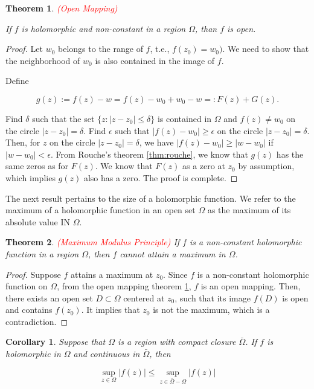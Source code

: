 \documentclass{article}
\newtheorem{theorem}{Theorem}
\newtheorem{corollary}{Corollary}
\begin{document}
\begin{theorem} \label{thm:open_map} \textcolor{red}{(Open Mapping)}

If $f$ is holomorphic and non-constant in a region $\Omega$, than $f$ is open.
\end{theorem}

\begin{proof}
Let $w_0$ belongs to the range of $f$, t.e., $f(z_0)=w_0)$. We need to show that the neighborhood of $w_0$ is also contained in the image of $f$. 

Define

\begin{equation*}
g(z):=f(z)-w=f(z)-w_0+w_0-w=:F(z)+G(z).
\end{equation*}

Find $\delta$ such that the set $\{z:|z-z_0|\leq \delta\}$ is contained in $\Omega$ and $f(z)\neq w_0$ on the circle $|z-z_0|=\delta$. Find $\epsilon$ such that $|f(z)-w_0|\geq\epsilon$ on the circle $|z-z_0|=\delta$. Then, for $z$ on the circle $|z-z_0|=\delta$, we have $|f(z)-w_0|\geq|w-w_0|$ if $|w-w_0|<\epsilon$. From Rouche's theorem \ref{thm:rouche}, we know that $g(z)$ has the same zeros as for $F(z)$. We know that $F(z)$ as a zero at $z_0$ by assumption, which implies $g(z)$ also has a zero. The proof is complete.

\end{proof}

The next result pertains to the size of a holomorphic function. We refer to the maximum of a holomorphic function in an open set $\Omega$ as the maximum of its absolute value IN $\Omega$.

\begin{theorem} \textcolor{red}{(Maximum Modulus Principle)}
If $f$ is a non-constant holomorphic function in a region $\Omega$, then $f$ cannot attain a maximum in $\Omega$.
\end{theorem}

\begin{proof}
Suppose $f$ attains a maximum at $z_0$. Since $f$ is a non-constant holomorphic function on $\Omega$, from the open mapping theorem \ref{thm:open_map}, $f$ is an open mapping. Then, there exists an open set $D\subset\Omega$ centered at $z_0$, such that its image $f(D)$ is open and contains $f(z_0)$. It implies that $z_0$ is not the maximum, which is a contradiction.
\end{proof}

\begin{corollary}
Suppose that $\Omega$ is a region with compact closure $\bar{\Omega}$. If $f$ is holomorphic in $\Omega$ and continuous in $\bar{\Omega}$, then

\begin{equation*}
\sup_{z\in\Omega}|f(z)|\leq\sup_{z\in\bar{\Omega}-\Omega}|f(z)|
\end{equation*}
\end{corollary}
\end{document}
